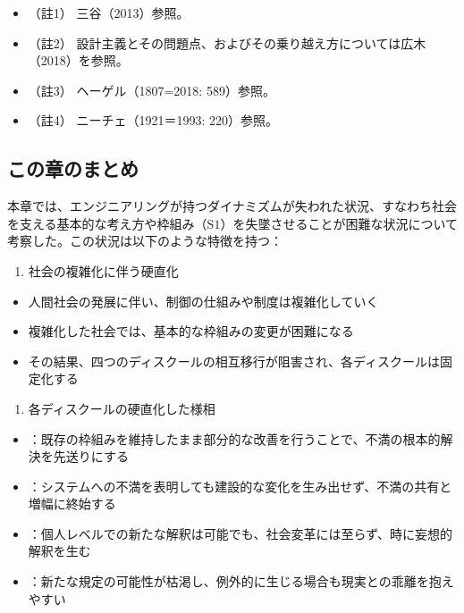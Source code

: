 \begin{itemize}
\tightlist
\item
  （註1） 三谷（2013）\cite{Mitani}参照。
\item
  （註2）
  設計主義とその問題点、およびその乗り越え方については広木（2018）\cite{Hiroki}を参照。
\item
  （註3） ヘーゲル（1807=2018: 589）\cite{Hegel2}参照。
\item
  （註4） ニーチェ（1921＝1993: 220）\cite{Nietzsche3}参照。
\end{itemize}

\subsection{この章のまとめ}\label{ux3053ux306eux7ae0ux306eux307eux3068ux3081}

本章では、エンジニアリングが持つダイナミズムが失われた状況、すなわち社会を支える基本的な考え方や枠組み（\(\textrm{S}1\)）を失墜させることが困難な状況について考察した。この状況は以下のような特徴を持つ：

\begin{enumerate}
\def\labelenumi{\arabic{enumi}.}
\tightlist
\item
  社会の複雑化に伴う硬直化
\end{enumerate}

\begin{itemize}
\tightlist
\item
  人間社会の発展に伴い、制御の仕組みや制度は複雑化していく
\item
  複雑化した社会では、基本的な枠組みの変更が困難になる
\item
  その結果、四つのディスクールの相互移行が阻害され、各ディスクールは固定化する
\end{itemize}

\begin{enumerate}
\def\labelenumi{\arabic{enumi}.}
\setcounter{enumi}{1}
\tightlist
\item
  各ディスクールの硬直化した様相
\end{enumerate}

\begin{itemize}
\tightlist
\item
  ：既存の枠組みを維持したまま部分的な改善を行うことで、不満の根本的解決を先送りにする
\item
  ：システムへの不満を表明しても建設的な変化を生み出せず、不満の共有と増幅に終始する
\item
  ：個人レベルでの新たな解釈は可能でも、社会変革には至らず、時に妄想的解釈を生む
\item
  ：新たな規定の可能性が枯渇し、例外的に生じる場合も現実との乖離を抱えやすい
\end{itemize}

